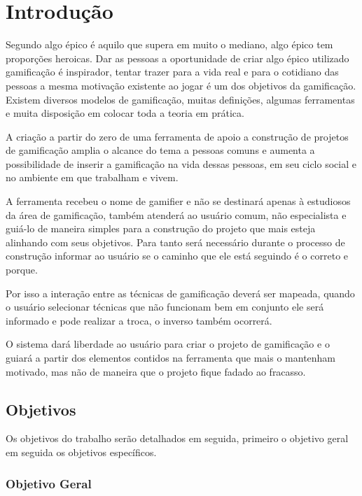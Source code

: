 \chapter[Introdução]{Introdução}


Segundo \cite{mcgonigal2011reality} algo épico é aquilo que supera em muito o mediano, algo épico tem proporções heroicas. Dar as pessoas a oportunidade de criar algo épico utilizado gamificação é inspirador, tentar trazer para a vida real e para o cotidiano das pessoas a mesma motivação existente ao jogar é um dos objetivos da gamificação. Existem diversos modelos de gamificação, muitas definições, algumas ferramentas e muita disposição em colocar toda a teoria em prática. 

A criação a partir do zero de uma ferramenta de apoio a construção de projetos de gamificação amplia o alcance do tema a pessoas comuns e aumenta a possibilidade de inserir a gamificação na vida dessas pessoas, em seu ciclo social e no ambiente em que trabalham e vivem.

A ferramenta recebeu o nome de gamifier e não se destinará apenas à estudiosos da área de gamificação, também atenderá ao usuário comum, não especialista e guiá-lo de maneira simples para a construção do projeto que mais esteja alinhando com seus objetivos.  Para tanto será necessário durante o processo de construção informar ao usuário se o caminho que ele está seguindo é o correto e porque.

 Por isso a interação entre as técnicas de gamificação deverá ser mapeada, quando o usuário selecionar técnicas que não funcionam bem em conjunto ele será informado e pode realizar a troca, o inverso também ocorrerá.

 O sistema dará liberdade ao usuário para criar o projeto de gamificação e o guiará a partir dos elementos contidos na ferramenta que mais o mantenham motivado, mas não de maneira que o projeto fique fadado ao fracasso.


\section{Objetivos}

Os objetivos do trabalho serão detalhados em seguida, primeiro o objetivo geral em seguida os objetivos específicos.


\subsection{Objetivo Geral}

